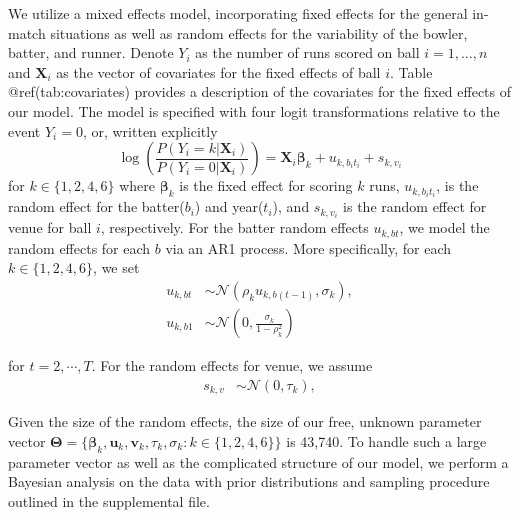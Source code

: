 \documentclass[
  12pt,
]{article}
\begin{document}
We utilize a mixed effects model, incorporating fixed effects for the
general in-match situations as well as random effects for the
variability of the bowler, batter, and runner. Denote \(Y_i\) as the
number of runs scored on ball \(i = 1,\dots,n\) and \(\boldsymbol{X}_i\)
as the vector of covariates for the fixed effects of ball \(i\). Table
@ref(tab:covariates) provides a description of the covariates for the
fixed effects of our model. The model is specified with four logit
transformations relative to the event \(Y_i = 0\), or, written
explicitly \begin{equation}
\log\left(\frac{P(Y_i = k | \boldsymbol{X}_i)}{P(Y_i = 0 | \boldsymbol{X}_i)}\right) = \boldsymbol{X}_i \boldsymbol{\beta}_k + u_{k, b_it_i} + s_{k,v_i} \label{model}
\end{equation} for \(k \in \{1,2,4,6\}\) where \(\boldsymbol{\beta}_k\)
is the fixed effect for scoring \(k\) runs, \(u_{k,b_it_i}\), is the
random effect for the batter(\(b_i\)) and year(\(t_i\)), and
\(s_{k,v_i}\) is the random effect for venue for ball \(i\),
respectively. For the batter random effects \({u}_{k,bt}\), we model the
random effects for each \(b\) via an AR1 process. More specifically, for
each \(k \in \{1,2,4,6\}\), we set \begin{align}
{u}_{k,bt} & \sim \mathcal{N}(\rho_k {u}_{k,b(t-1)},\sigma_{k}), \nonumber \\ 
{u}_{k,b1} & \sim \mathcal{N}(0,\frac{\sigma_{k}}{1-\rho_k^2})\label{ranefs_bat}
\end{align}

for \(t = 2,\cdots,T\). For the random effects for venue, we assume
\begin{align}
{s}_{k,v} & \sim \mathcal{N}(0,\tau_{k}), \label{ranefs_ven}
\end{align}

Given the size of the random effects, the size of our free, unknown
parameter vector
\(\boldsymbol{\Theta} = \{\boldsymbol{\beta}_k,\boldsymbol{u}_k, \boldsymbol{v}_k,\tau_k,\sigma_k: k \in \{1,2,4,6\}\}\)
is 43,740. To handle such a large parameter vector as well as the
complicated structure of our model, we perform a Bayesian analysis on
the data with prior distributions and sampling procedure outlined in the
supplemental file.
\end{document}
